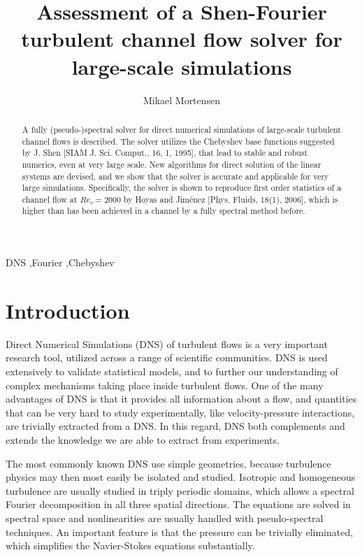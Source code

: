 \documentclass[11pt, oneside]{elsarticle}
\begin{document}
\begin{frontmatter}

\title{Assessment of a Shen-Fourier turbulent channel flow solver for large-scale simulations}
\author[mmo]{Mikael Mortensen}
\address[mmo]{Department of Mathematics, Division of Mechanics, University of Oslo}

\begin{abstract}
A fully (pseudo-)spectral solver for direct numerical simulations of large-scale turbulent channel flows is described. The solver utilizes the Chebyshev base functions suggested by J. Shen [SIAM J. Sci. Comput., 16, 1, 1995], that lead to stable and robust numerics, even at very large scale. New algorithms for direct solution of the linear systems are devised, and we show that the solver is accurate and applicable for very large simulations. Specifically, the solver is shown to reproduce first order statistics of a channel flow at $Re_{\tau}=2000$ by Hoyas and Jim\'{e}nez [Phys. Fluids, 18(1), 2006], which is higher than has been achieved in a channel by a fully spectral method before. 
\end{abstract}
\begin{keyword}
DNS \sep Fourier \sep Chebyshev
\end{keyword}

\end{frontmatter}
\section{Introduction}
Direct Numerical Simulations (DNS) of turbulent flows is a very important research tool, utilized across a range of scientific communities. DNS is used extensively to validate statistical models, and to further our understanding of complex mechanisms taking place inside turbulent flows. One of the many advantages of DNS is that it provides all information about a flow, and quantities that can be very hard to study experimentally, like velocity-pressure interactions, are trivially extracted from a DNS. In this regard, DNS both complements and extends the knowledge we are able to extract from experiments.

The most commonly known DNS use simple geometries, because turbulence physics may then most easily be isolated and studied. Isotropic and homogeneous turbulence are usually studied in triply periodic domains, which allows a spectral Fourier decomposition in all three spatial directions. The equations are solved in spectral space and nonlinearities are usually handled with pseudo-spectral techniques. An important feature is that the pressure can be trivially eliminated, which simplifies the Navier-Stokes equations substantially.
\end{document}
